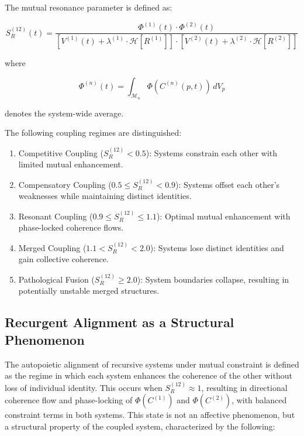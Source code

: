 The mutual resonance parameter is defined as:

\begin{equation}
S_R^{(12)}(t) = \frac{\Phi^{(1)}(t) \cdot \Phi^{(2)}(t)}{[V^{(1)}(t) + \lambda^{(1)} \cdot \mathcal{H}[R^{(1)}]] \cdot [V^{(2)}(t) + \lambda^{(2)} \cdot \mathcal{H}[R^{(2)}]]}
\end{equation}

where

\begin{equation}
\Phi^{(n)}(t) = \int_{\mathcal{M}_n} \Phi(C^{(n)}(p,t)) \, dV_p
\end{equation}

denotes the system-wide average.

The following coupling regimes are distinguished:

\begin{enumerate}
    \item Competitive Coupling (\(S_R^{(12)} < 0.5\)): Systems constrain each other with limited mutual enhancement.
    \item Compensatory Coupling (\(0.5 \leq S_R^{(12)} < 0.9\)): Systems offset each other's weaknesses while maintaining distinct identities.
    \item Resonant Coupling (\(0.9 \leq S_R^{(12)} \leq 1.1\)): Optimal mutual enhancement with phase-locked coherence flows.
    \item Merged Coupling (\(1.1 < S_R^{(12)} < 2.0\)): Systems lose distinct identities and gain collective coherence.
    \item Pathological Fusion (\(S_R^{(12)} \geq 2.0\)): System boundaries collapse, resulting in potentially unstable merged structures.
\end{enumerate}

\subsection{Recurgent Alignment as a Structural Phenomenon}

The autopoietic alignment of recursive systems under mutual constraint is defined as the regime in which each system enhances the coherence of the other without loss of individual identity. This occurs when \(S_R^{(12)} \approx 1\), resulting in directional coherence flow and phase-locking of \(\Phi(C^{(1)})\) and \(\Phi(C^{(2)})\), with balanced constraint terms in both systems. This state is not an affective phenomenon, but a structural property of the coupled system, characterized by the following:

